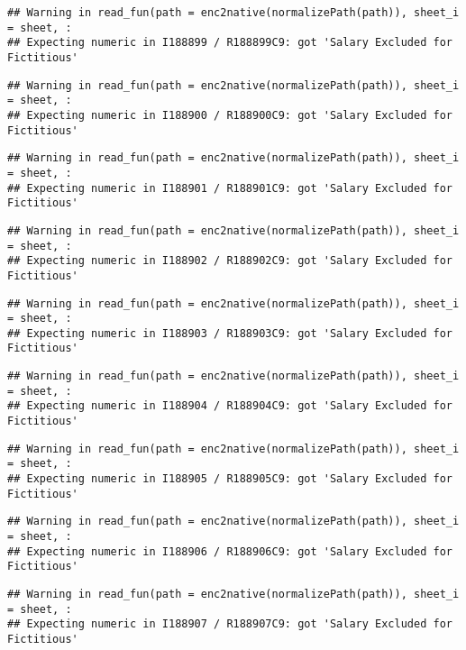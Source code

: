 \documentclass[
]{article}
\begin{document}
\begin{verbatim}
## Warning in read_fun(path = enc2native(normalizePath(path)), sheet_i = sheet, :
## Expecting numeric in I188899 / R188899C9: got 'Salary Excluded for Fictitious'
\end{verbatim}

\begin{verbatim}
## Warning in read_fun(path = enc2native(normalizePath(path)), sheet_i = sheet, :
## Expecting numeric in I188900 / R188900C9: got 'Salary Excluded for Fictitious'
\end{verbatim}

\begin{verbatim}
## Warning in read_fun(path = enc2native(normalizePath(path)), sheet_i = sheet, :
## Expecting numeric in I188901 / R188901C9: got 'Salary Excluded for Fictitious'
\end{verbatim}

\begin{verbatim}
## Warning in read_fun(path = enc2native(normalizePath(path)), sheet_i = sheet, :
## Expecting numeric in I188902 / R188902C9: got 'Salary Excluded for Fictitious'
\end{verbatim}

\begin{verbatim}
## Warning in read_fun(path = enc2native(normalizePath(path)), sheet_i = sheet, :
## Expecting numeric in I188903 / R188903C9: got 'Salary Excluded for Fictitious'
\end{verbatim}

\begin{verbatim}
## Warning in read_fun(path = enc2native(normalizePath(path)), sheet_i = sheet, :
## Expecting numeric in I188904 / R188904C9: got 'Salary Excluded for Fictitious'
\end{verbatim}

\begin{verbatim}
## Warning in read_fun(path = enc2native(normalizePath(path)), sheet_i = sheet, :
## Expecting numeric in I188905 / R188905C9: got 'Salary Excluded for Fictitious'
\end{verbatim}

\begin{verbatim}
## Warning in read_fun(path = enc2native(normalizePath(path)), sheet_i = sheet, :
## Expecting numeric in I188906 / R188906C9: got 'Salary Excluded for Fictitious'
\end{verbatim}

\begin{verbatim}
## Warning in read_fun(path = enc2native(normalizePath(path)), sheet_i = sheet, :
## Expecting numeric in I188907 / R188907C9: got 'Salary Excluded for Fictitious'
\end{verbatim}
\end{document}
